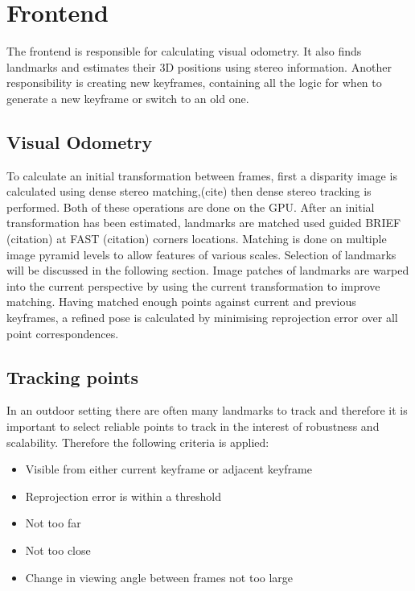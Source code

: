 \section{Frontend}
\label{sec:scavislam_frontend}

The frontend is responsible for calculating visual odometry.  It also finds landmarks and estimates their 3D positions using stereo information.  Another responsibility is creating new keyframes, containing all the logic for when to generate a new keyframe or switch to an old one. 

\subsection{Visual Odometry}


To calculate an initial transformation between frames, first a disparity image is calculated using dense stereo matching,(cite) then dense stereo tracking is performed.  Both of these operations are done on the GPU.  After an initial transformation has been estimated, landmarks are matched used guided BRIEF (citation) at FAST (citation) corners locations.  Matching is done on multiple image pyramid levels to allow features of various scales. Selection of landmarks will be discussed in the following section.  Image patches of landmarks are warped into the current perspective by using the current transformation to improve matching. Having matched enough points against current and previous keyframes, a refined pose is calculated by minimising reprojection error over all point correspondences.

\subsection{Tracking points}

In an outdoor setting there are often many landmarks to track and therefore it is important to select reliable points to track in the interest of robustness and scalability.  Therefore the following criteria is applied:
\begin{itemize}
 \setlength{\itemsep}{0cm}%
 \setlength{\parskip}{0cm}%
 \item Visible from either current keyframe or adjacent keyframe
 \item Reprojection error is within a threshold
 \item Not too far
 \item Not too close
 \item Change in viewing angle between frames not too large
\end{itemize}

